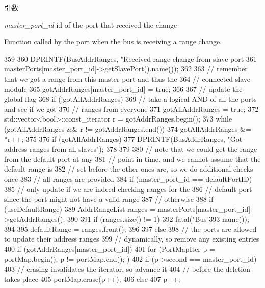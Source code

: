 \begin{DoxyParams}{引数}
\item[{\em master\_\-port\_\-id}]id of the port that received the change\end{DoxyParams}
Function called by the port when the bus is receiving a range change. 


\begin{DoxyCode}
359 {
360     DPRINTF(BusAddrRanges, "Received range change from slave port %
361             masterPorts[master_port_id]->getSlavePort().name());
362 
363     // remember that we got a range from this master port and thus the
364     // connected slave module
365     gotAddrRanges[master_port_id] = true;
366 
367     // update the global flag
368     if (!gotAllAddrRanges) {
369         // take a logical AND of all the ports and see if we got
370         // ranges from everyone
371         gotAllAddrRanges = true;
372         std::vector<bool>::const_iterator r = gotAddrRanges.begin();
373         while (gotAllAddrRanges &&  r != gotAddrRanges.end()) {
374             gotAllAddrRanges &= *r++;
375         }
376         if (gotAllAddrRanges)
377             DPRINTF(BusAddrRanges, "Got address ranges from all slaves\n");
378     }
379 
380     // note that we could get the range from the default port at any
381     // point in time, and we cannot assume that the default range is
382     // set before the other ones are, so we do additional checks once
383     // all ranges are provided
384     if (master_port_id == defaultPortID) {
385         // only update if we are indeed checking ranges for the
386         // default port since the port might not have a valid range
387         // otherwise
388         if (useDefaultRange) {
389             AddrRangeList ranges = masterPorts[master_port_id]->getAddrRanges();
390 
391             if (ranges.size() != 1)
392                 fatal("Bus %
393                       name());
394 
395             defaultRange = ranges.front();
396         }
397     } else {
398         // the ports are allowed to update their address ranges
399         // dynamically, so remove any existing entries
400         if (gotAddrRanges[master_port_id]) {
401             for (PortMapIter p = portMap.begin(); p != portMap.end(); ) {
402                 if (p->second == master_port_id)
403                     // erasing invalidates the iterator, so advance it
404                     // before the deletion takes place
405                     portMap.erase(p++);
406                 else
407                     p++;
}}}}
\end{DoxyCode}
